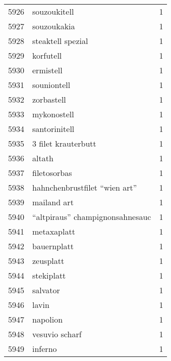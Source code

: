 \begin{tabular}{llr}
5926 &                                       souzoukitell &      1 \\
5927 &                                        souzoukakia &      1 \\
5928 &                                  steaktell spezial &      1 \\
5929 &                                          korfutell &      1 \\
5930 &                                          ermistell &      1 \\
5931 &                                        souniontell &      1 \\
5932 &                                         zorbastell &      1 \\
5933 &                                        mykonostell &      1 \\
5934 &                                      santorinitell &      1 \\
5935 &                                3 filet krauterbutt &      1 \\
5936 &                                             altath &      1 \\
5937 &                                       filetosorbas &      1 \\
5938 &                      hahnchenbrustfilet “wien art” &      1 \\
5939 &                                        mailand art &      1 \\
5940 &                    “altpiraus” champignonsahnesauc &      1 \\
5941 &                                        metaxaplatt &      1 \\
5942 &                                        bauernplatt &      1 \\
5943 &                                          zeusplatt &      1 \\
5944 &                                         stekiplatt &      1 \\
5945 &                                           salvator &      1 \\
5946 &                                              lavin &      1 \\
5947 &                                           napolion &      1 \\
5948 &                                     vesuvio scharf &      1 \\
5949 &                                            inferno &      1 \\

\end{tabular}
